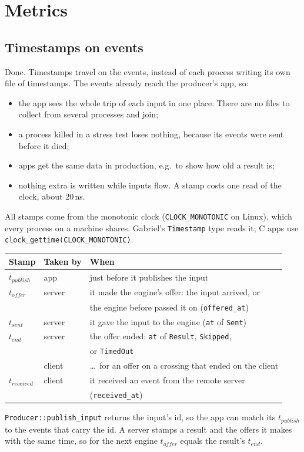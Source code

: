 \documentclass[11pt]{article}
\newcommand{\code}[1]{\texttt{#1}}
\begin{document}
\section{Metrics}

\subsection{Timestamps on events}

Done. Timestamps travel on the events, instead of each process writing its
own file of timestamps. The events already reach the producer's app, so:
\begin{itemize}[nosep]
  \item the app sees the whole trip of each input in one place. There are no
        files to collect from several processes and join;
  \item a process killed in a stress test loses nothing, because its events
        were sent before it died;
  \item apps get the same data in production, e.g.\ to show how old a result
        is;
  \item nothing extra is written while inputs flow. A stamp costs one read of
        the clock, about 20\,ns.
\end{itemize}

All stamps come from the monotonic clock (\code{CLOCK\_MONOTONIC} on Linux),
which every process on a machine shares. Gabriel's \code{Timestamp} type reads
it; C apps use \code{clock\_gettime(CLOCK\_MONOTONIC)}.
\begin{center}
\small
\begin{tabular}{@{}lll@{}}
\toprule
Stamp & Taken by & When \\
\midrule
$t_\mathit{publish}$ & app    & just before it publishes the input \\
$t_\mathit{offer}$   & server & it made the engine's offer: the input arrived, or \\
                     &        & the engine before passed it on (\code{offered\_at}) \\
$t_\mathit{sent}$    & server & it gave the input to the engine (\code{at} of \code{Sent}) \\
$t_\mathit{end}$     & server & the offer ended: \code{at} of \code{Result}, \code{Skipped}, \\
                     &        & or \code{TimedOut} \\
                     & client & \ldots\ for an offer on a crossing that ended on the client \\
$t_\mathit{received}$ & client & it received an event from the remote server \\
                     &        & (\code{received\_at}) \\
\bottomrule
\end{tabular}
\end{center}
\code{Producer::publish\_input} returns the input's id, so the app can match
its $t_\mathit{publish}$ to the events that carry the id. A server stamps a
result and the offers it makes with the same time, so for the next engine
$t_\mathit{offer}$ equals the result's $t_\mathit{end}$.
\end{document}
